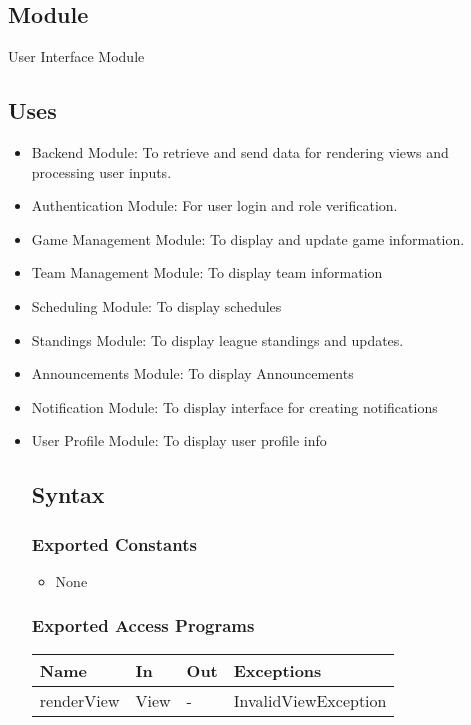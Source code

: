\documentclass[12pt, titlepage]{article}
\begin{document}
\subsection{Module}

User Interface Module

\subsection{Uses}

\begin{itemize}
    \item Backend Module: To retrieve and send data for rendering views and processing user inputs.
    \item Authentication Module: For user login and role verification.
    \item Game Management Module: To display and update game information.
    \item Team Management Module: To display team information
    \item Scheduling Module: To display schedules
    \item Standings Module: To display league standings and updates.
    \item Announcements Module: To display Announcements
    \item Notification Module: To display interface for creating notifications
    \item User Profile Module: To display user profile info
    
\subsection{Syntax}

\subsubsection{Exported Constants}

\begin{itemize}
    \item None
\end{itemize}

\subsubsection{Exported Access Programs}

\begin{center}
  \begin{tabularx}{\textwidth}{|l|X|X|X|}
  \hline
  \textbf{Name} & \textbf{In} & \textbf{Out} & \textbf{Exceptions} \\
  \hline
  renderView & View & - & InvalidViewException \\
  \hline
  \end{tabularx}
\end{center}


\end{itemize}
\end{document}
